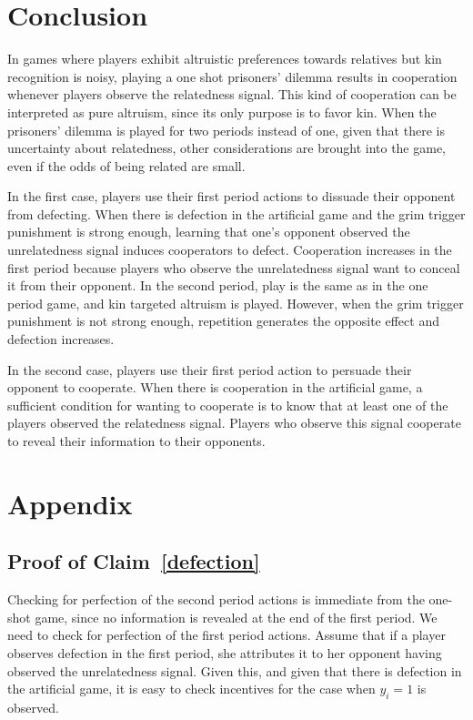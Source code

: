 \documentclass[12pt]{article}
\begin{document}
\section{Conclusion}

In games where players exhibit altruistic preferences towards relatives but kin recognition is noisy, playing a one shot prisoners' dilemma results in cooperation whenever players observe the relatedness signal. This kind of cooperation can be interpreted as pure altruism, since its only purpose is to favor kin. When the prisoners' dilemma is played for two periods instead of one, given that there is uncertainty about relatedness, other considerations are brought into the game, even if the odds of being related are small. 

In the first case, players use their first period actions to dissuade their opponent from defecting. When there is defection in the artificial game and the grim trigger punishment is strong enough, learning that one's opponent observed the unrelatedness signal induces cooperators to defect. Cooperation increases in the first period because players who observe the unrelatedness signal want to conceal it from their opponent. In the second period, play is the same as in the one period game, and kin targeted altruism is played. However, when the grim trigger punishment is not strong enough, repetition generates the opposite effect and defection increases. 

In the second case, players use their first period action to persuade their opponent to cooperate. When there is cooperation in the artificial game, a sufficient condition for wanting to cooperate is to know that at least one of the players observed the relatedness signal. Players who observe this signal cooperate to reveal their information to their opponents.   

\section{Appendix}
\subsection{Proof of Claim~\ref{defection}}
Checking for perfection of the second period actions is immediate from the one-shot game, since no information is revealed at the end of the first period. We need to check for perfection of the first period actions. Assume that if a player observes defection in the first period, she attributes it to her opponent having observed the unrelatedness signal. Given this, and given that there is defection in the artificial game, it is easy to check incentives for the case when $y_{i}=1$ is observed.
\end{document}
